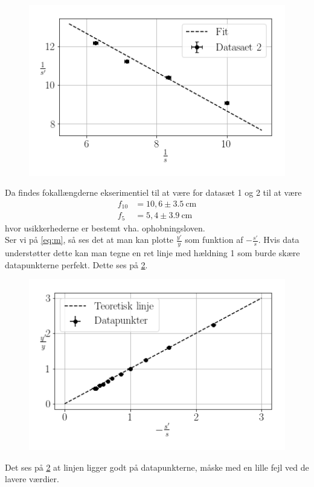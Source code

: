 \begin{figure}[H]
    \includegraphics[width=\linewidth]{2.png}
    \caption{}
    \label{fig:2}
\end{figure}

Da findes fokallængderne ekserimentiel til at være for datasæt 1 og 2 til at være
\begin{align}
    \nonumber f_{10} &=  10,6 \pm \SI{3,5}{\centi\meter} \\
    \nonumber f_{5} &= 5,4 \pm \SI{3,9}{\centi\meter}
\end{align}
hvor usikkerhederne er bestemt vha. ophobningsloven.
\\ Ser vi på \cref{eq:m}, så ses det at man kan plotte $\frac{y'}{y}$ som funktion af $-\frac{s'}{s}$. Hvis data understøtter dette kan man tegne en ret linje med hældning 1 som burde skære datapunkterne perfekt. Dette ses på \cref{fig:3}.
\begin{figure}[H]
    \includegraphics[width=\linewidth]{3.png}
    \caption{}
    \label{fig:3}
\end{figure}
Det ses på \cref{fig:3} at linjen ligger godt på datapunkterne, måske med en lille fejl ved de lavere værdier.
